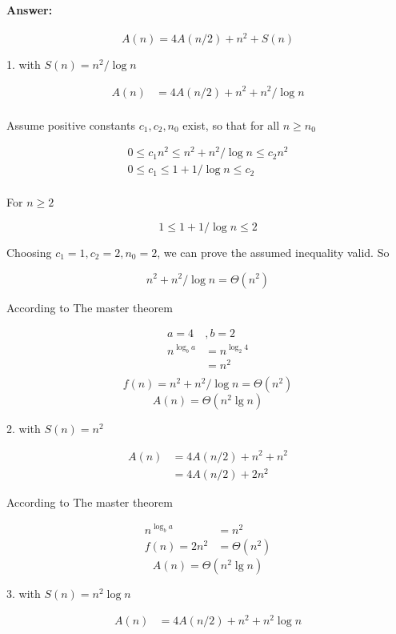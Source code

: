\documentclass{article}
\begin{document}
\paragraph{Answer:}

$$
A(n)=4A(n/2)+n^2+S(n)
$$

1. with $S(n)=n^2/\log n$

$$\begin{aligned}
A(n)&=4A(n/2)+n^2+n^2/\log n\\
\end{aligned}$$

Assume positive constants $c_1, c_2, n_0$ exist, so that for all $n \ge n_0$

$$\begin{aligned}
0 \le c_1n^2 \le n^2+n^2/\log n \le c_2n^2\\
0 \le c_1 \le 1+1/\log n \le c_2\\
\end{aligned}$$

For $n \ge 2$

$$1 \le 1+1/\log n\le2$$

Choosing $c_1=1, c_2=2, n_0=2$, we can prove the assumed inequality valid. So

$$
n^2+n^2/\log n=\Theta(n^2)
$$

According to The master theorem

$$\begin{aligned}
a=4&, b=2\\
n^{\log_b a}&=n^{\log_2 4}\\
&=n^2\\
\end{aligned}$$
$$
f(n)=n^2+n^2/\log n=\Theta(n^2)
$$
$$
A(n)=\Theta(n^2\lg n)
$$

2. with $S(n)=n^2$


$$\begin{aligned}
A(n)&=4A(n/2)+n^2+n^2\\
&=4A(n/2)+2n^2
\end{aligned}$$

According to The master theorem

$$\begin{aligned}
n^{\log_b a}&=n^2\\
f(n)=2n^2&=\Theta(n^2)
\end{aligned}$$
$$
A(n)=\Theta(n^2\lg n)
$$

3. with $S(n)=n^2\log n$

$$\begin{aligned}
A(n)&=4A(n/2)+n^2+n^2\log n\\
\end{aligned}$$
\end{document}
